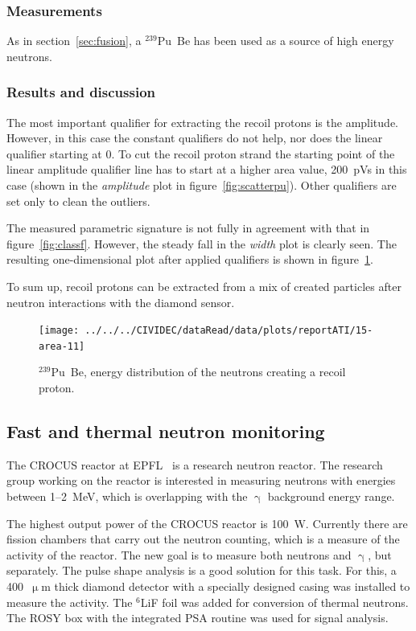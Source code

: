 \subsubsection{Measurements}
As in section~\ref{sec:fusion}, a $^{239}$Pu~Be has been used as a source of high energy neutrons.
\subsubsection{Results and discussion}
The most important qualifier for extracting the recoil protons is the amplitude. However, in this case the constant qualifiers do not help, nor does the linear qualifier starting at 0. To cut the recoil proton strand the starting point of the linear amplitude qualifier line has to start at a higher area value, 200~pVs in this case (shown in the \emph{amplitude} plot in figure~\ref{fig:scatterpu}). Other qualifiers are set only to clean the outliers.

The measured parametric signature is not fully in agreement with that in figure~\ref{fig:classf}. However, the steady fall in the \emph{width} plot is clearly seen. The resulting one-dimensional plot after applied qualifiers is shown in figure~\ref{fig:scatterpuarea}. 

To sum up, recoil protons can be extracted from a mix of created particles after neutron interactions with the diamond sensor.



\begin{figure}[!t]
\centering
\texttt{[image: ../../../CIVIDEC/dataRead/data/plots/reportATI/15-area-11]}
\caption{$^{239}$Pu~Be, energy distribution of the neutrons creating a recoil proton.}
\label{fig:scatterpuarea}
\end{figure}








\clearpage
\subsection{Fast and thermal neutron monitoring}
The CROCUS reactor at EPFL~\cite{EPFL:00000} is a research neutron reactor. The research group working on the reactor is interested in measuring neutrons with energies between 1--2~MeV, which is overlapping with the $\upgamma$ background energy range.

The highest output power of the CROCUS reactor is 100~W. Currently there are fission chambers that carry out the neutron counting, which is a measure of the activity of the reactor. The new goal is to measure both neutrons and $\upgamma$, but separately. The pulse shape analysis is a good solution for this task. For this, a 400~$\upmu$m thick diamond detector with a specially designed casing was installed to measure the activity. The $^6$LiF foil was added for conversion of thermal neutrons. The ROSY box with the integrated PSA routine was used for signal analysis.

